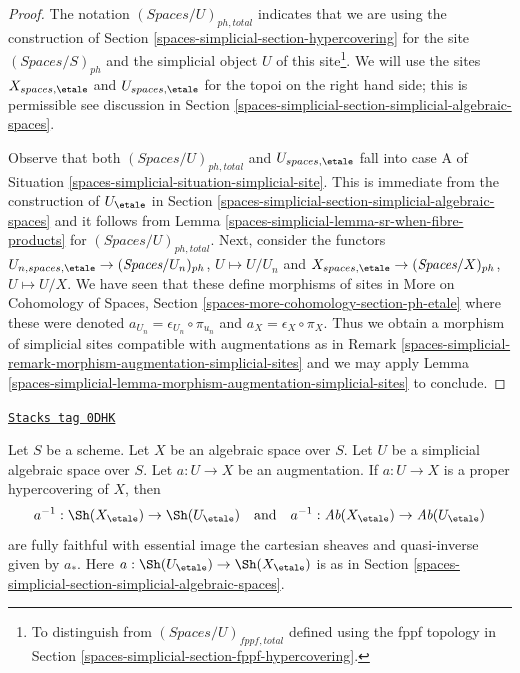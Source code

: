 \begin{proof}
The notation $(\textit{Spaces}/U)_{ph, total}$ indicates that
we are using the construction of
Section \ref{spaces-simplicial-section-hypercovering}
for the site $(\textit{Spaces}/S)_{ph}$ and the
simplicial object $U$ of this site\footnote{To distinguish from
$(\textit{Spaces}/U)_{fppf, total}$ defined using the fppf
topology in Section \ref{spaces-simplicial-section-fppf-hypercovering}.}.
We will use the sites $X_{spaces, \etale}$ and $U_{spaces, \etale}$
for the topoi on the right hand side; this is permissible
see discussion in Section \ref{spaces-simplicial-section-simplicial-algebraic-spaces}.

\medskip\noindent
Observe that both $(\textit{Spaces}/U)_{ph, total}$ and
$U_{spaces, \etale}$
fall into case A of Situation \ref{spaces-simplicial-situation-simplicial-site}.
This is immediate from the construction of
$U_\etale$ in Section \ref{spaces-simplicial-section-simplicial-algebraic-spaces}
and it follows from Lemma \ref{spaces-simplicial-lemma-sr-when-fibre-products}
for $(\textit{Spaces}/U)_{ph, total}$.
Next, consider the functors
$U_{n, spaces, \etale} \to (\textit{Spaces}/U_n)_{ph}$, $U \mapsto U/U_n$
and
$X_{spaces, \etale} \to (\textit{Spaces}/X)_{ph}$, $U \mapsto U/X$.
We have seen that these define morphisms of sites in
More on Cohomology of Spaces, Section
\ref{spaces-more-cohomology-section-ph-etale}
where these were denoted $a_{U_n} = \epsilon_{U_n} \circ \pi_{u_n}$
and $a_X = \epsilon_X \circ \pi_X$.
Thus we obtain a morphism of simplicial sites compatible with
augmentations as in Remark \ref{spaces-simplicial-remark-morphism-augmentation-simplicial-sites}
and we may apply
Lemma \ref{spaces-simplicial-lemma-morphism-augmentation-simplicial-sites} to conclude.
\end{proof}

\begin{lemma}
\label{spaces-simplicial-lemma-descent-sheaves-for-ph-hypercovering}
\href{https://stacks.math.columbia.edu/tag/0DHK}{\texttt{Stacks tag 0DHK}}

Let $S$ be a scheme. Let $X$ be an algebraic space over $S$.
Let $U$ be a simplicial algebraic space over $S$. Let $a : U \to X$
be an augmentation. If $a : U \to X$ is a proper hypercovering of $X$,
then
$$
a^{-1} : \Sh(X_\etale) \to \Sh(U_\etale)
\quad\text{and}\quad
a^{-1} : \textit{Ab}(X_\etale) \to \textit{Ab}(U_\etale)
$$
are fully faithful with essential image the cartesian sheaves and
quasi-inverse given by $a_*$. Here $a : \Sh(U_\etale) \to \Sh(X_\etale)$
is as in Section \ref{spaces-simplicial-section-simplicial-algebraic-spaces}.
\end{lemma}

